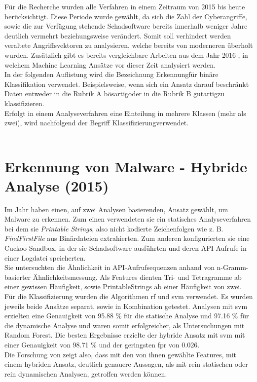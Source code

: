 \documentclass[
    12pt, %
    DIV10,
    ngerman, %
    a4paper, %
    oneside, %
    titlepage, %
    parskip=half, %
    headings=normal, %
    listof=totoc, %
    bibliography=totoc, %
    index=totoc, %
    captions=tableheading, %
    final %
]{scrreprt}
\begin{document}
Für die Recherche wurden alle Verfahren in einem Zeitraum von 2015 bis heute berücksichtigt. Diese Periode wurde gewählt, da sich die Zahl der Cyberangriffe, sowie die zur Verfügung stehende Schadsoftware bereits innerhalb weniger Jahre deutlich vermehrt beziehungsweise verändert. Somit soll verhindert werden veraltete Angriffsvektoren zu analysieren, welche bereits von moderneren überholt wurden. Zusätzlich gibt es bereits vergleichbare Arbeiten aus dem Jahr 2016 \parencite[s.][]{Buczak2016}, in welchem Machine Learning Ansätze vor dieser Zeit analysiert werden.\\
In der folgenden Auflistung wird die Bezeichnung \glqq Erkennung\grqq für binäre Klassifikation verwendet. Beispielsweise, wenn sich ein Ansatz darauf beschränkt Daten entweder in die Rubrik A \glqq bösartig\grqq oder in die Rubrik B \glqq gutartig\grqq zu klassifizieren.\\
Erfolgt in einem Analyseverfahren eine Einteilung in mehrere Klassen (mehr als zwei), wird nachfolgend der Begriff 
\glqq Klassifizierung\grqq verwendet.
\\\\
\section{Erkennung von Malware - Hybride Analyse (2015)}
Im Jahr \citeyear{Shijo2015} haben \citeauthor{Shijo2015} einen, auf zwei Analysen basierenden, Ansatz gewählt, um Malware zu erkennen. Zum einen verwendeten sie ein statisches Analyseverfahren bei dem sie \emph{Printable Strings}, also nicht kodierte Zeichenfolgen wie z. B. \emph{FindFirstFile} aus Binärdateien extrahierten. Zum anderen konfigurierten sie eine Cuckoo Sandbox, in der sie Schadsoftware ausführten und deren API Aufrufe in einer Logdatei speicherten.\\
Sie untersuchten die Ähnlichkeit in API-Aufrufsequenzen anhand von n-Gramm-basierter Ähnlichkeitsmessung. 
Als Features dienten Tri- und Tetragramme ab einer gewissen Häufigkeit, sowie PrintableStrings ab einer Häufigkeit von zwei.
Für die Klassifizierung wurden die Algorithmen \ac{rf} und \ac{svm} verwendet.
Es wurden jeweils beide Ansätze separat, sowie in Kombination getestet. Analysen mit \ac{svm} erzielten eine Genauigkeit von 95.88 \% für die statische Analyse und 97.16 \% für die dynamische Analyse und waren somit erfolgreicher, als Untersuchungen mit Random Forest. Die besten Ergebnisse erzielte der hybride Ansatz mit \ac{svm} mit einer Genauigkeit von 98.71 \% und der geringsten \ac{fpr} von 0.026.\\
Die Forschung von \citeauthor{Shijo2015} zeigt also, dass mit den von ihnen gewählte Features, mit einem hybriden Ansatz, deutlich genauere Aussagen, als mit rein statischen oder rein dynamischen Analysen, getroffen werden können.
\end{document}

